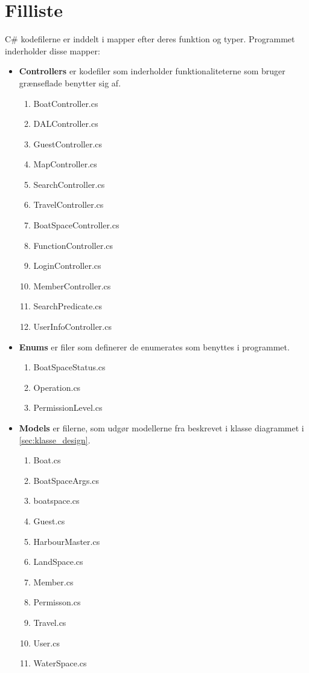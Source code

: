 \chapter{Filliste}
\label{cha:filliste}

C\# kodefilerne er inddelt i mapper efter deres funktion og typer.
Programmet inderholder disse mapper:

\begin{itemize}
	\item \textbf{Controllers} er kodefiler som inderholder funktionaliteterne som bruger grænseflade benytter sig af. 
		\begin{enumerate}
			\item BoatController.cs
			\item DALController.cs
			\item GuestController.cs
			\item MapController.cs
			\item SearchController.cs
			\item TravelController.cs
			\item BoatSpaceController.cs
			\item FunctionController.cs
			\item LoginController.cs
			\item MemberController.cs
			\item SearchPredicate.cs
			\item UserInfoController.cs
		\end{enumerate}	
\end{itemize}


\begin{itemize}
	\item \textbf{Enums} er filer som definerer de enumerates som benyttes i programmet.
		\begin{enumerate}
			\item BoatSpaceStatus.cs
			\item Operation.cs
			\item PermissionLevel.cs
		\end{enumerate}
\end{itemize}

\begin{itemize}
	\item \textbf{Models} er filerne, som udgør modellerne fra beskrevet i klasse diagrammet i \cref{sec:klasse_design}.
		\begin{enumerate}
			\item Boat.cs
			\item BoatSpaceArgs.cs
			\item boatspace.cs
			\item Guest.cs
			\item HarbourMaster.cs
			\item LandSpace.cs
			\item Member.cs
			\item Permisson.cs
			\item Travel.cs
			\item User.cs
			\item WaterSpace.cs

		\end{enumerate}
\end{itemize}


